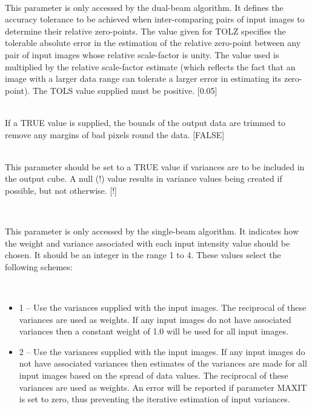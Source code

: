 \documentclass[twoside,11pt]{article}
\renewcommand{\_}{\texttt{\symbol{95}}}
\newcommand{\sstsubsection}[1]{ \item[{#1}] \mbox{} \\}
\newcommand{\sstitemlist}[1]{
  \mbox{} \\
  \vspace{-3.5ex}
  \begin{itemize}
     #1
  \end{itemize}
}
\newcommand{\sstitem}{\item}
\newcommand{\sstsubsection}[1]{\item[{#1}]}
\newcommand{\sstitemlist}[1]{
      \begin{itemize}
         #1
      \end{itemize}
      \\
   }
\newcommand{\sstitem}{\item}
\begin{document}
{{{      }
      \sstsubsection{
         TOLZ = \_REAL (Read)
      }{
         This parameter is only accessed by the dual-beam algorithm. It
         defines the accuracy tolerance to be achieved when inter-comparing
         pairs of input images to determine their relative zero-points. The
         value given for TOLZ specifies the tolerable absolute error in the
         estimation of the relative zero-point between any pair of input
         images whose relative scale-factor is unity. The value used is
         multiplied by the relative scale-factor estimate (which reflects the
         fact that an image with a larger data range can tolerate a larger
         error in estimating its zero-point). The TOLS value supplied must
         be positive. [0.05]
      }
      \sstsubsection{
         TRIMBAD = \_LOGICAL (Read)
      }{
         If a TRUE value is supplied, the bounds of the output data are
         trimmed to remove any margins of bad pixels round the data. [FALSE]
      }
      \sstsubsection{
         VARIANCE = \_LOGICAL (Read)
      }{
         This parameter should be set to a TRUE value if variances are to
         be included in the output cube. A null (!) value results in variance
         values being created if possible, but not otherwise. [!]
      }
      \sstsubsection{
         WEIGHTS = \_INTEGER (Read)
      }{
         This parameter is only accessed by the single-beam algorithm. It
         indicates how the weight and variance associated with each input
         intensity value should be chosen. It should be an integer in the
         range 1 to 4. These values select the following schemes:

         \sstitemlist{

            \sstitem
            1 -- Use the variances supplied with the input images. The
            reciprocal of these variances are used as weights. If any input
            images do not have associated variances then a constant weight of
            1.0 will be used for all input images.

            \sstitem
            2 -- Use the variances supplied with the input images. If any
            input images do not have associated variances then estimates of
            the variances are made for all input images based on the spread of
            data values. The reciprocal of these variances are used as weights.
            An error will be reported if parameter MAXIT is set to zero, thus
            preventing the iterative estimation of input variances.

}}}}
\end{document}
